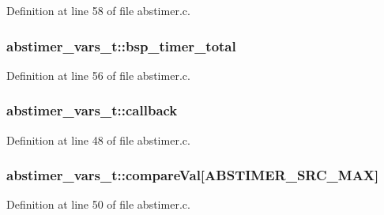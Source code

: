 Definition at line 58 of file abstimer.\+c.

\subsubsection[{\texorpdfstring{bsp\+\_\+timer\+\_\+total}{bsp_timer_total}}]{ abstimer\+\_\+vars\+\_\+t\+::bsp\+\_\+timer\+\_\+total}\hypertarget{structabstimer__vars__t_a31e2373c7888f99ea2de849700b6da02}{}\label{structabstimer__vars__t_a31e2373c7888f99ea2de849700b6da02}


Definition at line 56 of file abstimer.\+c.

\subsubsection[{\texorpdfstring{callback}{callback}}]{ abstimer\+\_\+vars\+\_\+t\+::callback}\hypertarget{structabstimer__vars__t_a278b88ac381a927dbb5a6bbe4a7541ab}{}\label{structabstimer__vars__t_a278b88ac381a927dbb5a6bbe4a7541ab}


Definition at line 48 of file abstimer.\+c.

\subsubsection[{\texorpdfstring{compare\+Val}{compareVal}}]{ abstimer\+\_\+vars\+\_\+t\+::compare\+Val\mbox{[}{\bf A\+B\+S\+T\+I\+M\+E\+R\+\_\+\+S\+R\+C\+\_\+\+M\+AX}\mbox{]}}\hypertarget{structabstimer__vars__t_a76de262a0e217980b036ef0c8d930d81}{}\label{structabstimer__vars__t_a76de262a0e217980b036ef0c8d930d81}


Definition at line 50 of file abstimer.\+c.


